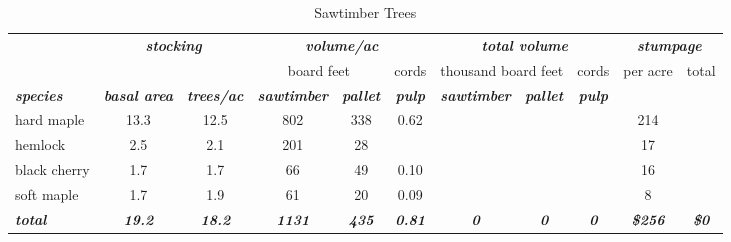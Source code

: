 \documentclass[landscape]{article}
\begin{document}
\begin{table}[H]

\caption{\label{tab:unnamed-chunk-19}Sawtimber Trees}
\fontsize{10}{12}\selectfont
\begin{tabular}[t]{lcccccccccc}
\toprule
\multicolumn{1}{c}{\em{\textbf{ }}} & \multicolumn{2}{c}{\em{\textbf{stocking}}} & \multicolumn{3}{c}{\em{\textbf{volume/ac }}} & \multicolumn{3}{c}{\em{\textbf{total volume}}} & \multicolumn{2}{c}{\em{\textbf{stumpage}}} \\
\cmidrule(l{3pt}r{3pt}){2-3} \cmidrule(l{3pt}r{3pt}){4-6} \cmidrule(l{3pt}r{3pt}){7-9} \cmidrule(l{3pt}r{3pt}){10-11}
\multicolumn{3}{c}{ } & \multicolumn{2}{c}{board feet} & \multicolumn{1}{c}{cords} & \multicolumn{2}{c}{thousand board feet} & \multicolumn{1}{c}{cords} & \multicolumn{1}{c}{per acre} & \multicolumn{1}{c}{total} \\
\cmidrule(l{3pt}r{3pt}){4-5} \cmidrule(l{3pt}r{3pt}){6-6} \cmidrule(l{3pt}r{3pt}){7-8} \cmidrule(l{3pt}r{3pt}){9-9} \cmidrule(l{3pt}r{3pt}){10-10} \cmidrule(l{3pt}r{3pt}){11-11}
\rowcolor[HTML]{DCDCDC}  \em{\textbf{species}} & \em{\textbf{basal area}} & \em{\textbf{trees/ac}} & \em{\textbf{sawtimber}} & \em{\textbf{pallet}} & \em{\textbf{pulp}} & \em{\textbf{sawtimber}} & \em{\textbf{pallet}} & \em{\textbf{pulp}} & \em{\textbf{ }} & \em{\textbf{ }}\\
\midrule
\rowcolor{gray!6}  hard maple & 13.3 & 12.5 & 802 & 338 & 0.62 &  &  &  & 214 & \\
 
hemlock & 2.5 & 2.1 & 201 & 28 &  &  &  &  & 17 & \\
 
\rowcolor{gray!6}  black cherry & 1.7 & 1.7 & 66 & 49 & 0.10 &  &  &  & 16 & \\
 
soft maple & 1.7 & 1.9 & 61 & 20 & 0.09 &  &  &  & 8 & \\
 
\rowcolor{gray!6}  \rowcolor[HTML]{DCDCDC}  \em{\textbf{total}} & \em{\textbf{19.2}} & \em{\textbf{18.2}} & \em{\textbf{1131}} & \em{\textbf{435}} & \em{\textbf{0.81}} & \em{\textbf{0}} & \em{\textbf{0}} & \em{\textbf{0}} & \em{\textbf{\$256}} & \em{\textbf{\$0}}\\
\bottomrule
\end{tabular}
\end{table}
\end{document}

